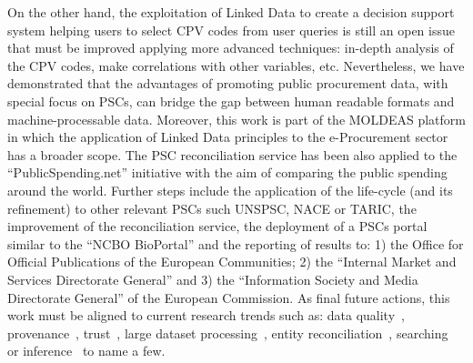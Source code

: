 \documentclass[preprint,12pt]{elsarticle}
\begin{document}
On the other hand, the exploitation of Linked Data to create a decision support system helping users to select CPV codes 
from user queries is still an open issue that must be improved applying more advanced techniques: in-depth analysis of the CPV codes, 
make correlations with other variables, etc. Nevertheless, we have demonstrated that the advantages of promoting public procurement 
data, with special focus on PSCs, can bridge the gap between human readable formats and machine-processable data. Moreover, 
this work is part of the MOLDEAS platform in which the application of Linked Data principles to the e-Procurement sector has a 
broader scope. The PSC reconciliation service has been also applied to the ``PublicSpending.net'' initiative with the aim 
of comparing the public spending around the world. Further steps include the application of the life-cycle (and its refinement) 
to other relevant PSCs such UNSPSC, NACE or TARIC, the improvement of the reconciliation service, the deployment of 
a PSCs portal similar to the ``NCBO BioPortal'' and the reporting of results to: 1) the Office for Official Publications 
of the European Communities; 2) the ``Internal Market and Services Directorate General'' and 3) the ``Information
Society and Media Directorate General'' of the European Commission. As final future actions, 
this work must be aligned to current research trends such as: data quality~\cite{bizer2007,Bizer2009QA,lodq,link-qa}, 
provenance~\cite{DBLP:conf/ipaw/HartigZ10}, trust~\cite{Carroll05namedgraphs}, large dataset processing~\cite{DBLP:conf/closer/HausenblasGHC12},
entity reconciliation~\cite{Maali_Cyganiak_2011}, searching~\cite{hoga-etal-2011-swse-JWS} or inference~\cite{DBLP:journals/ws/BonattiHPS11} to name a few.




\end{document}
